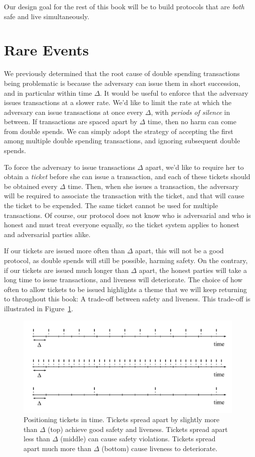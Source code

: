 Our design goal for the rest of this book will be to build protocols that
are \emph{both} safe and live simultaneously.

\section{Rare Events}
We previously determined that the root cause of double spending transactions being problematic
is because the adversary can issue them in short succession, and in particular within time
$\Delta$. It would be useful to enforce that the adversary issues transactions at a slower
rate. We'd like to limit the rate at which the adversary can issue transactions at
once every $\Delta$, with \emph{periods of silence} in between. If transactions are
spaced apart by $\Delta$ time, then no harm can come from double spends. We can simply
adopt the strategy of accepting the first among multiple double spending transactions,
and ignoring subsequent double spends.

To force the adversary to issue transactions $\Delta$ apart, we'd like to require her
to obtain a \emph{ticket} before she can issue a transaction, and each of these tickets
should be obtained every $\Delta$ time. Then, when she issues a transaction, the adversary
will be required to associate the transaction with the ticket, and that will cause the
ticket to be expended. The same ticket cannot be used for multiple transactions. Of course,
our protocol does not know who is adversarial and who is honest and must treat everyone
equally, so the ticket system applies to honest and adversarial parties alike.

If our tickets are issued more often than $\Delta$ apart, this will not be a good protocol,
as double spends will still be possible, harming safety. On the contrary, if our tickets
are issued much longer than $\Delta$ apart, the honest parties will take a long time to issue
transactions, and liveness will deteriorate. The choice of how often to allow tickets to be
issued highlights a theme that we will keep returning to throughout this book: A trade-off
between safety and liveness. This trade-off is illustrated in Figure~\ref{fig.time-tickets}.

\begin{figure}[h]
    \centering
    \includegraphics[width=0.8 \columnwidth,keepaspectratio]{figures/time-tickets.pdf}
    \caption{Positioning tickets in time. Tickets spread apart by slightly more than $\Delta$ (top)
             achieve good safety and liveness. Tickets spread apart less than $\Delta$ (middle)
             can cause safety violations. Tickets spread apart much more than $\Delta$ (bottom)
             cause liveness to deteriorate.}
    \label{fig.time-tickets}
\end{figure}

